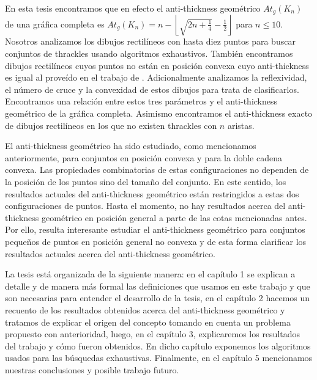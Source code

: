 En esta tesis encontramos que en efecto el anti-thickness geométrico $At_g(K_n)$ de una gráfica completa es
$At_g(K_n) = n - \left\lfloor\sqrt{2n + \frac{1}{4}}- \frac{1}{2}\right\rfloor$ para $n\leq 10$. Nosotros
analizamos los dibujos rectilíneos con hasta diez puntos para buscar conjuntos de thrackles usando
algoritmos exhaustivos. También encontramos dibujos rectilíneos cuyos puntos no están en posición convexa
cuyo anti-thickness es igual al proveído en el trabajo de \cite{Fabila-Monroy2018}. Adicionalmente
analizamos la reflexividad, el número de cruce y la convexidad de estos dibujos para trata de
clasificarlos. Encontramos una relación entre estos tres parámetros y el anti-thickness geométrico de la
gráfica completa. Asimismo encontramos el anti-thickness exacto de dibujos rectilíneos en los que no
existen thrackles con $n$ aristas.

El anti-thickness geométrico ha sido estudiado, como mencionamos anteriormente, para conjuntos en posición
convexa y para la doble cadena convexa. Las propiedades combinatorias de estas configuraciones no dependen
de la posición de los puntos sino del tamaño del conjunto. En este sentido, los resultados actuales del anti-thickness geométrico están restringidos a estas dos configuraciones de puntos. Hasta el momento, no hay resultados acerca del anti-thickness geométrico en posición general a parte de las cotas mencionadas antes. Por ello, resulta interesante estudiar el anti-thickness geométrico para conjuntos pequeños de puntos en posición general no convexa y de esta forma clarificar los resultados actuales acerca del anti-thickness geométrico.

La tesis está organizada de la siguiente manera: en el capítulo 1 se explican
a detalle y de manera más formal las definiciones que usamos en este trabajo y que
son necesarias para entender el desarrollo de la tesis, en el capítulo 2 hacemos un recuento de los
resultados obtenidos acerca del anti-thickness geométrico y tratamos de explicar el origen del concepto
tomando en cuenta un problema propuesto con anterioridad, luego, en el capítulo 3, explicaremos los
resultados del trabajo y cómo fueron obtenidos. En dicho capítulo exponemos los algoritmos usados para las
búsquedas exhaustivas. Finalmente, en el capítulo 5 mencionamos nuestras conclusiones y posible trabajo
futuro.
